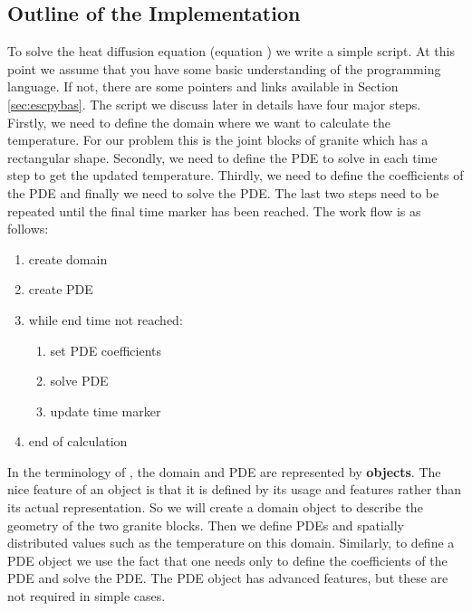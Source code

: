 \subsection{Outline of the Implementation}
\label{sec:outline}
To solve the heat diffusion equation (equation ) we write a simple \pyt script. At this point we assume that you have some basic understanding of the \pyt programming language. If not, there are some pointers and links available in Section \ref{sec:escpybas}. The script we discuss later in details have four major steps. Firstly, we need to define the domain where we want to 
calculate the temperature. For our problem this is the joint blocks of granite which has a rectangular shape. Secondly, we need to define the PDE to solve in each time step to get the updated temperature. Thirdly, we need to define the coefficients of the PDE and finally we need to solve the PDE. The last two steps need to be repeated until the final time marker has been reached. The work flow is as follows:
\begin{enumerate}
 \item create domain
 \item create PDE
 \item while end time not reached:
\begin{enumerate}
 \item set PDE coefficients
 \item solve PDE
 \item update time marker
\end{enumerate}
\item end of calculation
\end{enumerate}
In the terminology of \pyt, the domain and PDE are represented by \textbf{objects}. The nice feature of an object is that it is defined by its usage and features
rather than its actual representation. So we will create a domain object to describe the geometry of the two
granite blocks. Then we define PDEs and spatially distributed values such as the temperature 
on this domain. Similarly, to define a PDE object we use the fact that one needs only to define the coefficients of the PDE and solve the PDE. The PDE object has advanced features, but these are not required in simple cases.


